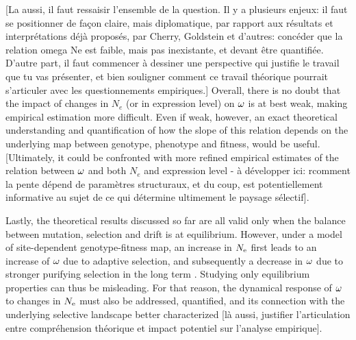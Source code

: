 \documentclass{article}
\begin{document}
	[La aussi, il faut ressaisir l'ensemble de la question. Il y a plusieurs enjeux: il faut se positionner de façon claire, mais diplomatique, par rapport aux résultats et interprétations déjà proposés, par Cherry, Goldstein et d'autres: concéder que la relation omega Ne est faible, mais pas inexistante, et devant être quantifiée. D'autre part, il faut commencer à dessiner une perspective qui justifie le travail que tu vas présenter, et bien souligner comment ce travail théorique pourrait s'articuler avec les questionnements empiriques.]
	Overall, there is no doubt that the impact of changes in $N_e$ (or in expression level) on $\omega$ is at best weak, making empirical estimation more difficult. Even if weak, however, an exact theoretical understanding and quantification of how the slope of this relation depends on the underlying map between genotype, phenotype and fitness, would be useful. [Ultimately, it could be confronted with more refined empirical estimates of the relation between $\omega$ and both $N_e$ and expression level - à développer ici: rcomment la pente dépend de paramètres structuraux, et du coup, est potentiellement informative au sujet de ce qui détermine ultimement le paysage sélectif].
	
	Lastly, the theoretical results discussed so far are all valid only when the balance between mutation, selection and drift is at equilibrium. However, under a model of site-dependent genotype-fitness map, an increase in $N_{\mathrm{e}}$ first leads to an increase of $\omega$ due to adaptive selection, and subsequently a decrease in $\omega$ due to stronger purifying selection in the long term \cite{Jones2016}.
	Studying only equilibrium properties can thus be misleading. For that reason, the dynamical response of $\omega$ to changes in $N_{\mathrm{e}}$ must also be addressed, quantified, and its connection with the underlying selective landscape better characterized [là aussi, justifier l'articulation entre compréhension théorique et impact potentiel sur l'analyse empirique].
	
\end{document}
